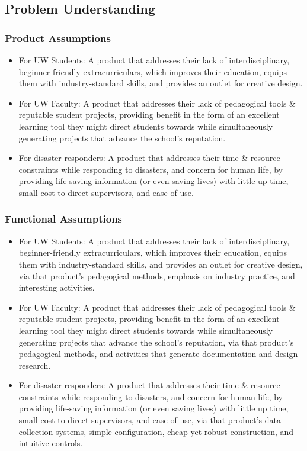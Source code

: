\documentclass[a4paper, 10pt]{article}
\begin{document}
	\subsection{Problem Understanding}
		\subsubsection{Product Assumptions}
			\begin{itemize}
			\item
			For UW Students: A product that addresses their lack of interdisciplinary, beginner-friendly extracurriculars, which improves their education, equips them with industry-standard skills, and provides an outlet for creative design. 
				
			\item
			For UW Faculty: A product that addresses their lack of pedagogical tools \& reputable student projects, providing benefit in the form of an excellent learning tool they might direct students towards while simultaneously generating projects that advance the school's reputation.
		
			\item		
			For disaster responders: A product that addresses their time \& resource constraints while responding to disasters, and concern for human life, by providing life-saving information (or even saving lives) with little up time, small cost to direct supervisors, and ease-of-use. 
			\end{itemize}


		\subsubsection{Functional Assumptions}
			\begin{itemize}
			\item 
			For UW Students: A product that addresses their lack of interdisciplinary, beginner-friendly extracurriculars, which improves their education, equips them with industry-standard skills, and provides an outlet for creative design, via that product's pedagogical methods, emphasis on industry practice, and interesting activities. 
		
			\item		
			For UW Faculty: A product that addresses their lack of pedagogical tools \& reputable student projects, providing benefit in the form of an excellent learning tool they might direct students towards while simultaneously generating projects that advance the school's reputation, via that product's pedagogical methods, and activities that generate documentation and design research. 
		
			\item
			For disaster responders: A product that addresses their time \& resource constraints while responding to disasters, and concern for human life, by providing life-saving information (or even saving lives) with little up time, small cost to direct supervisors, and ease-of-use, via that product's data collection systems, simple configuration, cheap yet robust construction, and intuitive controls.	
			\end{itemize}
		
\end{document}
